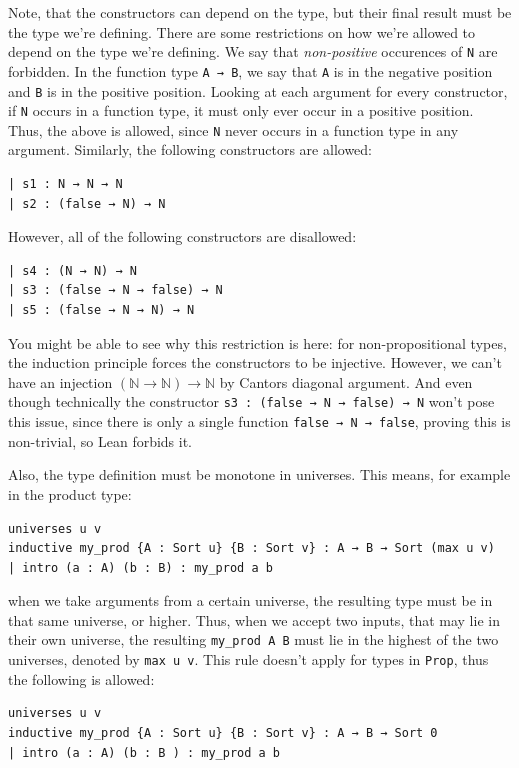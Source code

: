 \documentclass[a4paper, 12pt]{article}
\newcommand{\N}{\mathbb{N}}
\newcommand{\lean}[1]{\texttt{#1}}
\theoremstyle{changedot}
\theoremstyle{changedotbreak}
\theoremstyle{nonumberplain}
\begin{document}
Note, that the constructors can depend on the type, but their final result must be the type we're defining. There are some restrictions on how we're allowed to depend on the type we're defining. We say that \textit{non-positive} occurences of \lean{N} are forbidden. In the function type \lean{A → B}, we say that \lean{A} is in the negative position and \lean{B} is in the positive position. Looking at each argument for every constructor, if \lean{N} occurs in a function type, it must only ever occur in a positive position. Thus, the above is allowed, since \lean{N} never occurs in a function type in any argument. Similarly, the following constructors are allowed:
\begin{verbatim}
| s1 : N → N → N
| s2 : (false → N) → N
\end{verbatim}

However, all of the following constructors are disallowed:

\begin{verbatim}
| s4 : (N → N) → N
| s3 : (false → N → false) → N
| s5 : (false → N → N) → N
\end{verbatim}

You might be able to see why this restriction is here: for non-propositional types, the induction principle forces the constructors to be injective. However, we can't have an injection $(\N \to \N) \to \N$ by Cantors diagonal argument. And even though technically the constructor \lean{s3 : (false → N → false) → N} won't pose this issue, since there is only a single function \lean{false → N → false}, proving this is non-trivial, so Lean forbids it.

Also, the type definition must be monotone in universes. This means, for example in the product type:

\begin{verbatim}
universes u v
inductive my_prod {A : Sort u} {B : Sort v} : A → B → Sort (max u v)
| intro (a : A) (b : B) : my_prod a b
\end{verbatim}

when we take arguments from a certain universe, the resulting type must be in that same universe, or higher. Thus, when we accept two inputs, that may lie in their own universe, the resulting \lean{my_prod A B} must lie in the highest of the two universes, denoted by \lean{max u v}. This rule doesn't apply for types in \lean{Prop}, thus the following is allowed:

\begin{verbatim}
universes u v
inductive my_prod {A : Sort u} {B : Sort v} : A → B → Sort 0
| intro (a : A) (b : B ) : my_prod a b
\end{verbatim}
\end{document}

